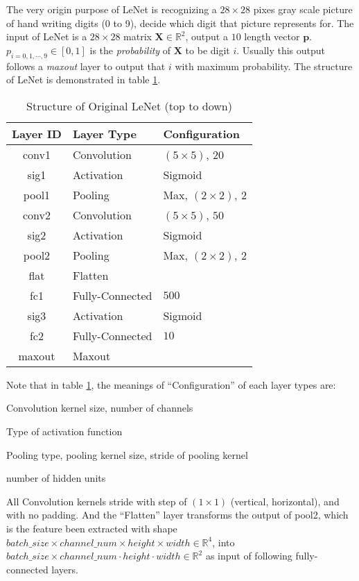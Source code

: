 The very origin purpose of LeNet is recognizing a $28 \times 28$ pixes gray scale picture of hand writing digits (0 to 9),
decide which digit that picture represents for. The input of LeNet is a $28 \times 28$ matrix $\mathbf{X} \in \mathbb{R}^2$,
output a $10$ length vector $\mathbf{p}$. $p_{i=0,1,\cdots,9} \in [0, 1]$ is the \textit{probability} of $\mathbf{X}$ to be
digit $i$. Usually this output follows a \textit{maxout} layer to output that $i$ with maximum probability.
The structure of LeNet is demonstrated in table \ref{tab::LeNet}.
\begin{table}[htb]
    \centering
    \caption{Structure of Original LeNet (top to down)}
    \label{tab::LeNet}
    \begin{tabular}{cll}
        \toprule
        Layer ID & Layer Type & Configuration \\
        \midrule
        conv1 & Convolution & $\left(5\times5\right)$, $20$ \\
        sig1  & Activation  & Sigmoid \\
        pool1 & Pooling     & Max, $\left(2\times2\right)$, $2$ \\
        conv2 & Convolution & $\left(5\times5\right)$, $50$ \\
        sig2  & Activation  & Sigmoid \\
        pool2 & Pooling     & Max, $\left(2\times2\right)$, $2$ \\
        flat  & Flatten     & \\
        fc1   & Fully-Connected & $500$ \\
        sig3  & Activation  & Sigmoid \\
        fc2   & Fully-Connected & $10$ \\
        maxout & Maxout     & \\
        \bottomrule
    \end{tabular}
\end{table}
Note that in table \ref{tab::LeNet}, the meanings of ``Configuration'' of each layer types are:
\begin{description}[labelsep=0.5em]
    \item[Convolution] Convolution kernel size, number of channels
    \item[Activation] Type of activation function
    \item[Pooling] Pooling type, pooling kernel size, stride of pooling kernel
    \item[Fully-Connected] number of hidden units
\end{description}
All Convolution kernels stride with step of $(1 \times 1)$ (vertical, horizontal),
and with no padding.
And the ``Flatten'' layer transforms the output of pool2, which is the feature been extracted
with shape $batch\_size \times channel\_num \times height \times width \in \mathbb{R}^4$, into
$batch\_size \times channel\_num \cdot height \cdot width \in \mathbb{R}^2$ as input of following
fully-connected layers.

